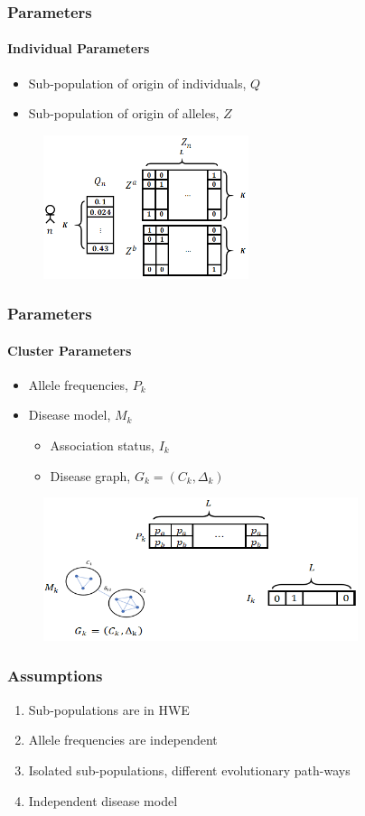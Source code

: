 \documentclass[xcolor=dvipsnames, professionalfont]{beamer}
\begin{document}
\begin{frame}
\frametitle{Parameters}
\framesubtitle{Individual Parameters}
\begin{itemize}
\item Sub-population of origin of individuals, $Q$
\item Sub-population of origin of alleles, $Z$
\end{itemize}
%
\begin{figure}[!ht]
\centering
\includegraphics[height=4.2cm]{imgs/IndivParams}
\end{figure}
\end{frame}

\begin{frame}
\frametitle{Parameters}
\framesubtitle{Cluster Parameters}
\begin{itemize}
\item Allele frequencies, $P_k$
\item Disease model, $M_k$
	\begin{itemize}
	\item Association status, $I_k$
	\item Disease graph, $G_k = (C_k, \Delta_k)$
	\end{itemize}
\end{itemize}
%
\begin{figure}[!ht]
\centering
\includegraphics[height=4.2cm]{imgs/ClusterParams}
\end{figure}
\end{frame}

\begin{frame}
\frametitle{Assumptions}
\begin{enumerate}
\item Sub-populations are in HWE \pause
\item Allele frequencies are independent \pause
\item Isolated sub-populations, different evolutionary path-ways \pause
\item Independent disease model
\end{enumerate}
\end{frame}
\end{document}
